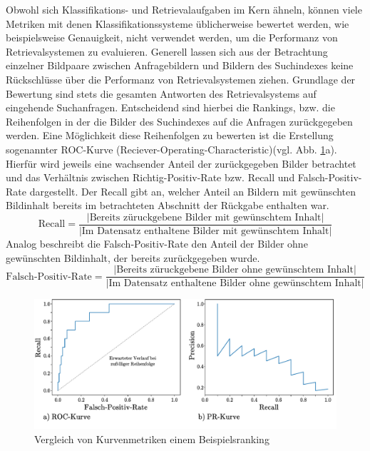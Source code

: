 Obwohl sich Klassifikations- und Retrievalaufgaben im Kern ähneln, können viele Metriken mit denen Klassifikationssysteme üblicherweise bewertet werden, wie beispielsweise Genauigkeit, nicht verwendet werden, um die Performanz von Retrievalsystemen zu evaluieren. Generell lassen sich aus der Betrachtung einzelner Bildpaare zwischen Anfragebildern und Bildern des Suchindexes keine Rückschlüsse über die Performanz von Retrievalsystemen ziehen. Grundlage der Bewertung sind stets die gesamten Antworten des Retrievalsystems auf eingehende Suchanfragen. Entscheidend sind hierbei die Rankings, bzw. die Reihenfolgen in der die Bilder des Suchindexes auf die Anfragen zurückgegeben werden. Eine Möglichkeit diese Reihenfolgen zu bewerten ist die Erstellung sogenannter ROC-Kurve (Reciever-Operating-Characteristic)(vgl. Abb. \ref{metric_curve}a). Hierfür wird jeweils eine wachsender Anteil der zurückgegeben Bilder betrachtet und das Verhältnis zwischen Richtig-Positiv-Rate bzw. Recall und Falsch-Positiv-Rate dargestellt. Der Recall gibt an, welcher Anteil an Bildern mit gewünschten Bildinhalt bereits im betrachteten Abschnitt der Rückgabe enthalten war.
\begin{equation}
\text{Recall} = \frac{|\text{Bereits züruckgebene Bilder mit gewünschtem Inhalt}|}{|\text{Im Datensatz enthaltene Bilder mit gewünschtem Inhalt}|}
\end{equation}
Analog beschreibt die Falsch-Positiv-Rate den Anteil der Bilder ohne gewünschten Bildinhalt, der bereits zurückgegeben wurde.
\begin{equation}
\text{Falsch-Positiv-Rate} = \frac{|\text{Bereits züruckgebene Bilder ohne gewünschtem Inhalt}|}{|\text{Im Datensatz enthaltene Bilder ohne gewünschtem Inhalt}|}
\end{equation}
\begin{figure}[h]
\includegraphics[scale=0.76]{metric_curves.pdf}
\caption{Vergleich von Kurvenmetriken einem Beispielsranking}
\label{metric_curve}
\end{figure}
